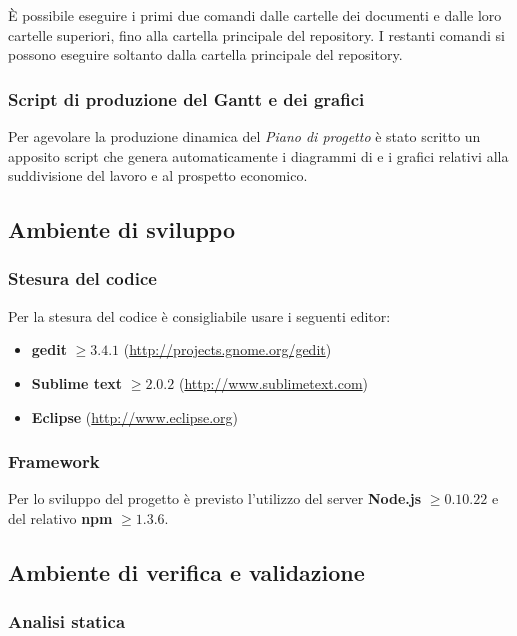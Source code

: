 È possibile eseguire i primi due comandi dalle cartelle dei documenti e dalle loro cartelle superiori, fino alla cartella principale del repository. I restanti comandi si possono eseguire soltanto dalla cartella principale del repository.

\subsubsection{Script di produzione del Gantt e dei grafici}
		\label{Gantt}
Per agevolare la produzione dinamica del \textit{Piano di progetto} è stato scritto un apposito script che genera automaticamente i diagrammi di  e i grafici relativi alla suddivisione del lavoro e al prospetto economico.

	\subsection{Ambiente di sviluppo}
		
		\subsubsection{Stesura del codice}
		
		Per la stesura del codice è consigliabile usare i seguenti editor:
		\begin{itemize}
			\item \textbf{gedit} $\geq 3.4.1$ (\url{http://projects.gnome.org/gedit})
			\item \textbf{Sublime text} $\geq 2.0.2$ (\url{http://www.sublimetext.com})
			\item \textbf{Eclipse} (\url{http://www.eclipse.org})
		\end{itemize}
		
		\subsubsection{Framework}
		
		Per lo sviluppo del progetto è previsto l'utilizzo del server \textbf{Node.js} $\geq 0.10.22$ e del relativo  \textbf{npm} $\geq 1.3.6$.

	\subsection{Ambiente di verifica e validazione}
		\subsubsection{Analisi statica}
		
